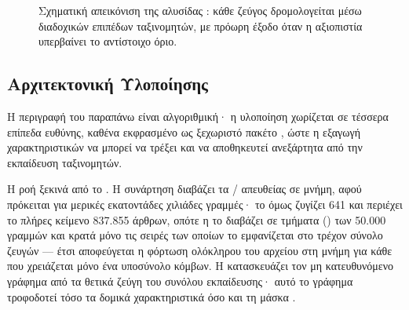 \begin{figure}[h!]
    \caption{Σχηματική απεικόνιση της αλυσίδας : κάθε ζεύγος
    δρομολογείται μέσω διαδοχικών επιπέδων ταξινομητών, με πρόωρη έξοδο όταν η
    αξιοπιστία υπερβαίνει το αντίστοιχο όριο.}
    \label{fig:cascade}
\end{figure}


\subsection{Αρχιτεκτονική Υλοποίησης}
\label{subsec:implementation-architecture}

Η περιγραφή του  παραπάνω είναι αλγοριθμική· η υλοποίηση χωρίζεται σε
τέσσερα επίπεδα ευθύνης, καθένα εκφρασμένο ως ξεχωριστό πακέτο , ώστε η
εξαγωγή χαρακτηριστικών να μπορεί να τρέξει και να αποθηκευτεί ανεξάρτητα από την
εκπαίδευση ταξινομητών.

Η ροή ξεκινά από το \texttt{}.
Η συνάρτηση \texttt{} διαβάζει τα \texttt{}/\texttt{} απευθείας σε
μνήμη, αφού πρόκειται για μερικές εκατοντάδες χιλιάδες γραμμές· το \texttt{}
όμως ζυγίζει 641 και περιέχει το πλήρες κείμενο  837.855 άρθρων, οπότε
η \texttt{} το διαβάζει σε τμήματα () των 50.000 γραμμών
και κρατά μόνο τις σειρές των οποίων το  εμφανίζεται στο τρέχον σύνολο ζευγών —
έτσι αποφεύγεται η φόρτωση ολόκληρου του αρχείου στη μνήμη για κάθε  που
χρειάζεται μόνο ένα υποσύνολο κόμβων. Η \texttt{} κατασκευάζει τον μη
κατευθυνόμενο γράφημα  από τα θετικά ζεύγη του συνόλου εκπαίδευσης· αυτό το
γράφημα τροφοδοτεί τόσο τα δομικά χαρακτηριστικά όσο και τη μάσκα .

